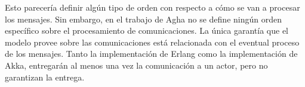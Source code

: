 Esto parecería definir algún tipo de orden con respecto a cómo se van a procesar los mensajes. Sin embargo, en el trabajo de Agha\cite{Agha:1986:AMC:7929} no se define ningún orden específico sobre el procesamiento de comunicaciones. La única garantía que el modelo provee sobre las comunicaciones está relacionada con el eventual proceso de los mensajes. Tanto la implementación de Erlang\cite{Cesarini:2009:EP:1717841} como la implementación de Akka\cite{Wyatt:2013:AC:2663429}, entregarán al menos una vez la comunicación a un actor, pero no garantizan la entrega.


